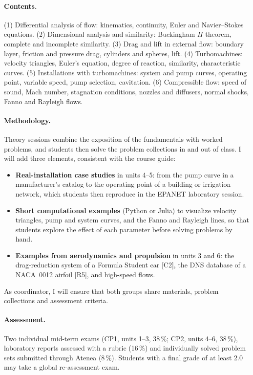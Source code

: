 \documentclass[11pt]{article}
\begin{document}
\paragraph{Contents.} (1) Differential analysis of flow: kinematics, continuity, Euler and
Navier--Stokes equations. (2) Dimensional analysis and similarity: Buckingham $\Pi$
theorem, complete and incomplete similarity. (3) Drag and lift in external flow: boundary
layer, friction and pressure drag, cylinders and spheres, lift. (4) Turbomachines:
velocity triangles, Euler's equation, degree of reaction, similarity, characteristic
curves. (5) Installations with turbomachines: system and pump curves, operating point,
variable speed, pump selection, cavitation. (6) Compressible flow: speed of sound, Mach
number, stagnation conditions, nozzles and diffusers, normal shocks, Fanno and Rayleigh
flows.

\paragraph{Methodology.} Theory sessions combine the exposition of the fundamentals with
worked problems, and students then solve the problem collections in and out of class. I
will add three elements, consistent with the course guide:
\begin{itemize}
  \item \textbf{Real-installation case studies} in units 4--5: from the pump curve in a
  manufacturer's catalog to the operating point of a building or irrigation network, which
  students then reproduce in the EPANET laboratory session.
  \item \textbf{Short computational examples} (Python or Julia) to visualize velocity
  triangles, pump and system curves, and the Fanno and Rayleigh lines, so that students
  explore the effect of each parameter before solving problems by hand.
  \item \textbf{Examples from aerodynamics and propulsion} in units 3 and 6: the
  drag-reduction system of a Formula Student car [C2], the DNS database of a NACA~0012
  airfoil [R5], and high-speed flows.
\end{itemize}
As coordinator, I will ensure that both groups share materials, problem collections and
assessment criteria.

\paragraph{Assessment.} Two individual mid-term exams (CP1, units 1--3, 38\,\%; CP2, units
4--6, 38\,\%), laboratory reports assessed with a rubric (16\,\%) and individually solved
problem sets submitted through Atenea (8\,\%). Students with a final grade of at least 2.0
may take a global re-assessment exam.
\end{document}

